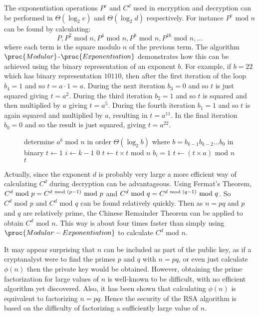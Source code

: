 The exponentiation operations $P^e$ and $C^d$ used in encryption and decryption
can be performed in $\Theta(\log_2 e)$ and $\Theta(\log_2 d)$ respectively.
For instance $P^e\mbox{ mod }n$ can be found by calculating:
\begin{displaymath}
  P, P^2\mbox{ mod }n, P^4\mbox{ mod }n, P^8\mbox{ mod }n, P^{16}\mbox{ mod }n, \dots
\end{displaymath}
where each term is the square modulo $n$ of the previous term.
The algorithm $\proc{Modular}$-$\proc{Exponentiation}$ demonstrates how this can be achieved
using the binary representation of an exponent $b$.
For example, if $b=22$ which has binary representation $10110$, then
after the first iteration of the loop $b_4=1$ and so $t=a\cdot1=a$.
During the next iteration $b_3=0$ and so $t$ is just squared giving
$t=a^2$. During the third iteration $b_2=1$ and so
$t$ is squared and then multiplied by $a$ giving $t=a^5$.
During the fourth iteration $b_1=1$ and so $t$ is again squared and
multiplied by $a$, resulting in $t=a^{11}$. In the final iteration
$b_0=0$ and so the result is just squared, giving $t=a^{22}$.
\begin{figure*}[htb]
\begin{codebox}
\li \Comment determine $a^b\mbox{ mod }n$ in order $\Theta(\log_2 b)$
       where $b=b_{k-1} b_{k-2}\dots b_0$ in binary
\li $t \gets 1$
\li \For $i\gets k\!-\!1$ \Downto $0$ \Do
\li    $t \gets t\times t\mbox{ mod }n$
\li    \If $b_i=1$ \Then
\li       $t \gets (t\times a)\mbox{ mod }n$
       \End
    \End
\li \Return $t$
\end{codebox}
\end{figure*}
Actually, since the exponent $d$ is probably very large a more efficient
way of calculating $C^d$ during decryption can be advantageous.
Using Fermat's Theorem, $C^d\mbox{ mod }p=C^{d\mbox{ \scriptsize mod }(p-1)}\mbox{ mod }p$
and $C^d\mbox{ mod }q=C^{d\mbox{ \scriptsize mod }(q-1)}\mbox{ mod }q$.
So $C^d\mbox{ mod }p$ and $C^d\mbox{ mod }q$ can be found relatively quickly.
Then as $n=pq$ and $p$ and $q$ are relatively prime,
the Chinese Remainder Theorem can be applied to obtain $C^d\mbox{ mod }n$.
This way is about four times faster than simply using $\proc{Modular-Exponentiation}$
to calculate $C^d\mbox{ mod }n$.

It may appear surprising that $n$ can be included as part of the public key,
as if a cryptanalyst were to find the primes $p$ and $q$ with $n=pq$, or even just
calculate $\phi(n)$ then the private key would be obtained.
However, obtaining the prime factorization for large values of $n$ is well-known
to be difficult, with no efficient algorithm yet discovered.
Also, it has been shown that calculating $\phi(n)$ is equivalent to
factorizing $n=pq$.
Hence the security of the RSA algorithm is based on the difficulty
of factorizing a sufficiently large value of $n$.

